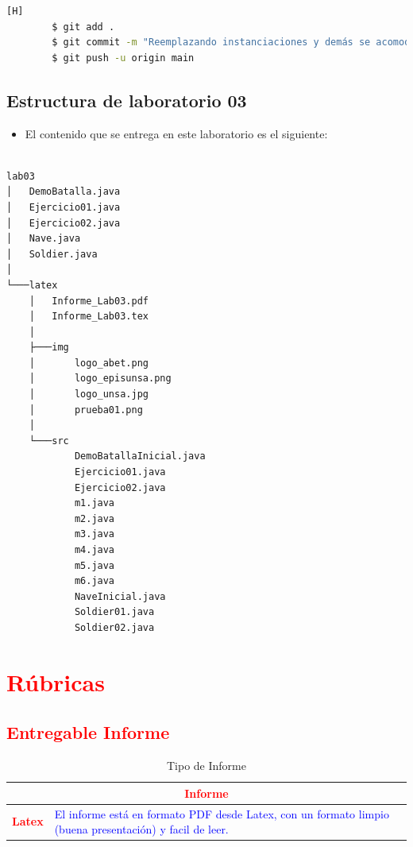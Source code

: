 \documentclass{article}
\begin{document}
    \begin{lstlisting}[language=bash,caption={Commit: Reemplazando instanciaciones y demás se acomodó el código para que utilice arrays de Soldier en lugar de String}][H]
		$ git add .
		$ git commit -m "Reemplazando instanciaciones y demás se acomodó el código para que utilice arrays de Soldier en lugar de String"			
		$ git push -u origin main
	\end{lstlisting}

    
    \newpage
	\subsection{Estructura de laboratorio 03}
    \begin{itemize}	
		\item El contenido que se entrega en este laboratorio es el siguiente:
	\end{itemize}
	
\begin{lstlisting}[style=ascii-tree]

lab03
│   DemoBatalla.java
│   Ejercicio01.java
│   Ejercicio02.java
│   Nave.java
│   Soldier.java
│
└───latex
    │   Informe_Lab03.pdf
    │   Informe_Lab03.tex
    │
    ├───img
    │       logo_abet.png
    │       logo_episunsa.png
    │       logo_unsa.jpg
    │       prueba01.png
    │
    └───src
            DemoBatallaInicial.java
            Ejercicio01.java
            Ejercicio02.java
            m1.java
            m2.java
            m3.java
            m4.java
            m5.java
            m6.java
            NaveInicial.java
            Soldier01.java
            Soldier02.java

\end{lstlisting}    

	\section{\textcolor{red}{Rúbricas}}
	
	\subsection{\textcolor{red}{Entregable Informe}}
	\begin{table}[H]
		\caption{Tipo de Informe}
		\setlength{\tabcolsep}{0.5em} %
		{\renewcommand{\arraystretch}{1.5}%
		\begin{tabular}{|p{3cm}|p{12cm}|}
			\hline
			\multicolumn{2}{|c|}{\textbf{\textcolor{red}{Informe}}}  \\
			\hline 
			\textbf{\textcolor{red}{Latex}} & \textcolor{blue}{El informe está en formato PDF desde Latex,  con un formato limpio (buena presentación) y facil de leer.}   \\ 
			\hline 
			
			
		\end{tabular}
	}
	\end{table}
	
\end{document}
